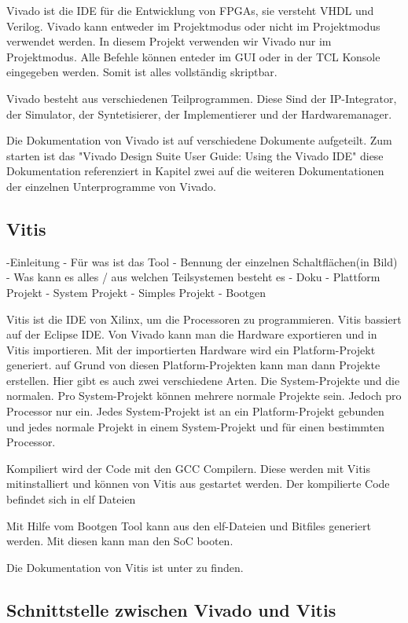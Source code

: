 \documentclass{article}
\begin{document}
Vivado ist die IDE für die Entwicklung von FPGAs, sie versteht VHDL und Verilog. Vivado kann entweder im Projektmodus oder nicht im Projektmodus verwendet werden. In diesem Projekt verwenden wir Vivado nur im Projektmodus. Alle Befehle können enteder im GUI oder in der TCL Konsole eingegeben werden. Somit ist alles vollständig skriptbar. 

Vivado besteht aus verschiedenen Teilprogrammen. Diese Sind der IP-Integrator, der Simulator, der Syntetisierer, der Implementierer und der Hardwaremanager.

Die Dokumentation von Vivado ist auf verschiedene Dokumente aufgeteilt. Zum starten ist das "Vivado Design Suite User Guide: Using the Vivado IDE" diese Dokumentation referenziert in Kapitel zwei auf die weiteren Dokumentationen der einzelnen Unterprogramme von Vivado.


\subsection{Vitis}
-Einleitung
    - Für was ist das Tool
    - Bennung der einzelnen Schaltflächen(in Bild)
    - Was kann es alles / aus welchen Teilsystemen besteht es
    - Doku
- Plattform Projekt
- System Projekt
- Simples Projekt
- Bootgen

Vitis ist die IDE von Xilinx, um die Processoren zu programmieren. Vitis bassiert auf der Eclipse IDE. 
Von Vivado kann man die Hardware exportieren und in Vitis importieren. Mit der importierten Hardware wird ein Platform-Projekt generiert. auf Grund von diesen Platform-Projekten kann man dann Projekte erstellen. Hier gibt es auch zwei verschiedene Arten. Die System-Projekte und die normalen. Pro System-Projekt können mehrere normale Projekte sein. Jedoch pro Processor nur ein. Jedes System-Projekt ist an ein Platform-Projekt gebunden und jedes normale Projekt in einem System-Projekt und für einen bestimmten Processor.

Kompiliert wird der Code mit den GCC Compilern. Diese werden mit Vitis mitinstalliert und können von Vitis aus gestartet werden. Der kompilierte Code befindet sich in elf Dateien

Mit Hilfe vom Bootgen Tool kann aus den elf-Dateien und Bitfiles generiert werden. Mit diesen kann man den SoC booten.

Die Dokumentation von Vitis ist unter  zu finden.

\subsection{Schnittstelle zwischen Vivado und Vitis}
\end{document}
